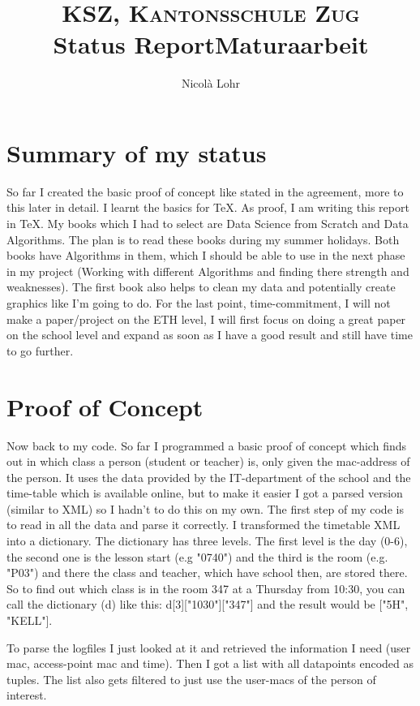 \documentclass[paper=a4, fontsize=11pt]{article}
\title{\normalfont \normalsize \textsc{KSZ, Kantonsschule Zug} \\ [25pt]
\huge Status Report\linebreak\linebreak \large Maturaarbeit\\ 
}
\author{Nicolà Lohr}
\begin{document}
\maketitle

\newpage
\section{Summary of my status}
So far I created the basic proof of concept like stated in the agreement, more to this later in detail. I learnt the basics for TeX. As proof, I am writing this report in TeX. My books which I had to select are Data Science from Scratch and Data Algorithms. The plan is to read these books during my summer holidays. Both books have Algorithms in them, which I should be able to use in the next phase in my project (Working with different Algorithms and finding there strength and weaknesses). The first book also helps to clean my data and potentially create graphics like I'm going to do. 
For the last point, time-commitment, I will not make a paper/project on the ETH level, I will first focus on doing a great paper on the school level and expand as soon as I have a good result and still have time to go further. 

\section{Proof of Concept}
Now back to my code. So far I programmed a basic proof of concept which finds out in which class a person (student or teacher) is, only given the mac-address of the person. It uses the data provided by the IT-department of the school and the time-table which is available online, but to make it easier I got a parsed version (similar to XML) so I hadn't to do this on my own. 
The first step of my code is to read in all the data and parse it correctly. I transformed the timetable XML into a dictionary. The dictionary has three levels. The first level is the day (0-6), the second one is the lesson start (e.g "0740") and the third is the room (e.g. "P03") and there the class and teacher, which have school then, are stored there. So to find out which class is in the room 347 at a Thursday from 10:30, you can call the dictionary (d) like this: d[3]["1030"]["347"] and the result would be ["5H", "KELL"]. 

To parse the logfiles I just looked at it and retrieved the information I need (user mac, access-point mac and time). Then I got a list with all datapoints encoded as tuples. The list also gets filtered to just use the user-macs of the person of interest.
\end{document}
